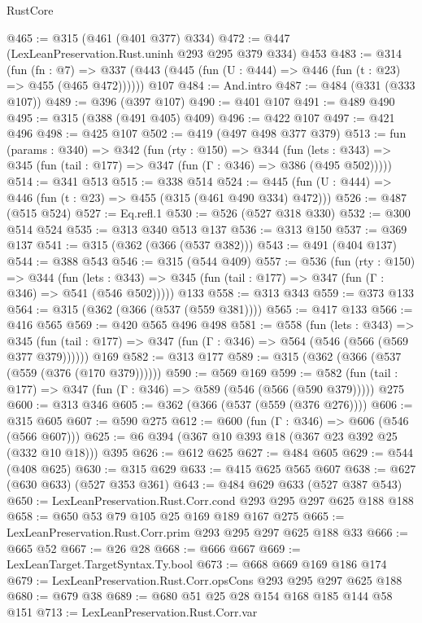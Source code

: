 \begin{lexlean}{RustCore}
\begin{coremodule}
@465 := @315 (@461 (@401 @377) @334)
@472 := @447 (LexLeanPreservation.Rust.uninh @293 @295 @379 @334) @453
@483 := @314
    (fun (fn : @7) =>
    @337 (@443 (@445 (fun (U : @444) => @446 (fun (t : @23) => @455 (@465 @472))))))
    @107
@484 := And.intro
@487 := @484 (@331 (@333 @107))
@489 := @396 (@397 @107)
@490 := @401 @107
@491 := @489 @490
@495 := @315 (@388 (@491 @405) @409)
@496 := @422 @107
@497 := @421 @496
@498 := @425 @107
@502 := @419 (@497 @498 @377 @379)
@513 := fun (params : @340) =>
  @342
    (fun (rty : @150) =>
    @344
      (fun (lets : @343) => @345 (fun (tail : @177) => @347 (fun (Γ : @346) => @386 (@495 @502)))))
@514 := @341 @513
@515 := @338 @514
@524 := @445 (fun (U : @444) => @446 (fun (t : @23) => @455 (@315 (@461 @490 @334) @472)))
@526 := @487 (@515 @524)
@527 := Eq.refl.{1}
@530 := @526 (@527 @318 @330)
@532 := @300 @514 @524
@535 := @313 @340 @513 @137
@536 := @313 @150
@537 := @369 @137
@541 := @315 (@362 (@366 (@537 @382)))
@543 := @491 (@404 @137)
@544 := @388 @543
@546 := @315 (@544 @409)
@557 := @536
    (fun (rty : @150) =>
    @344
      (fun (lets : @343) => @345 (fun (tail : @177) => @347 (fun (Γ : @346) => @541 (@546 @502)))))
    @133
@558 := @313 @343
@559 := @373 @133
@564 := @315 (@362 (@366 (@537 (@559 @381))))
@565 := @417 @133
@566 := @416 @565
@569 := @420 @565 @496 @498
@581 := @558
    (fun (lets : @343) =>
    @345 (fun (tail : @177) => @347 (fun (Γ : @346) => @564 (@546 (@566 (@569 @377 @379))))))
    @169
@582 := @313 @177
@589 := @315 (@362 (@366 (@537 (@559 (@376 (@170 @379))))))
@590 := @569 @169
@599 := @582 (fun (tail : @177) => @347 (fun (Γ : @346) => @589 (@546 (@566 (@590 @379))))) @275
@600 := @313 @346
@605 := @362 (@366 (@537 (@559 (@376 @276))))
@606 := @315 @605
@607 := @590 @275
@612 := @600 (fun (Γ : @346) => @606 (@546 (@566 @607)))
@625 := @6 @394 (@367 @10 @393 @18 (@367 @23 @392 @25 (@332 @10 @18))) @395
@626 := @612 @625
@627 := @484 @605
@629 := @544 (@408 @625)
@630 := @315 @629
@633 := @415 @625 @565 @607
@638 := @627 (@630 @633) (@527 @353 @361)
@643 := @484 @629 @633 (@527 @387 @543)
@650 := LexLeanPreservation.Rust.Corr.cond @293 @295 @297 @625 @188 @188
@658 := @650 @53 @79 @105 @25 @169 @189 @167 @275
@665 := LexLeanPreservation.Rust.Corr.prim @293 @295 @297 @625 @188 @33
@666 := @665 @52
@667 := @26 @28
@668 := @666 @667
@669 := LexLeanTarget.TargetSyntax.Ty.bool
@673 := @668 @669 @169 @186 @174
@679 := LexLeanPreservation.Rust.Corr.opsCons @293 @295 @297 @625 @188
@680 := @679 @38
@689 := @680 @51 @25 @28 @154 @168 @185 @144 @58 @151
@713 := LexLeanPreservation.Rust.Corr.var

\end{coremodule}
\end{lexlean}
